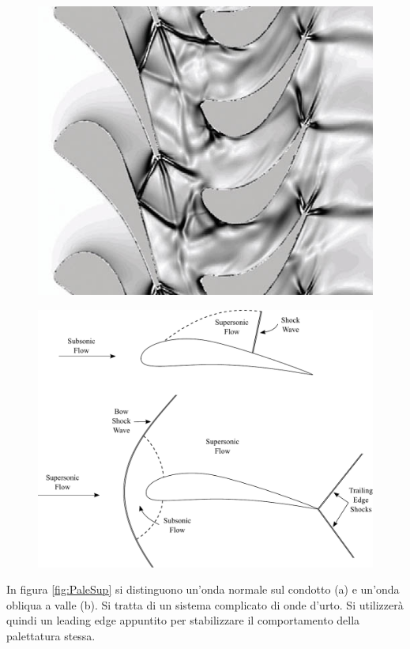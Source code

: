 \begin{figure}
\centering
\begin{minipage}{.5\textwidth}
  \centering
  \includegraphics[width=.95\linewidth]{fig/ou_schiera.png}
  \label{fig:ou_schiera}
\end{minipage}%
\begin{minipage}{.5\textwidth}
  \centering
  \includegraphics[width=.95\linewidth]{fig/SupSonic.pdf}
  \label{fig:SupSonic}
\end{minipage}
\end{figure}
In figura \ref{fig:PaleSup} si distinguono un'onda normale sul condotto (a) e un'onda obliqua a valle (b). Si tratta di un sistema complicato di onde d'urto. Si utilizzerà quindi un leading edge appuntito per stabilizzare il comportamento della palettatura stessa.
